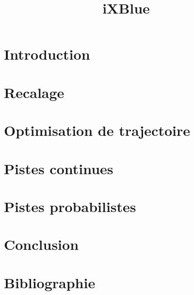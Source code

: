 \documentclass[11pt,oneside]{article}
\title{iXBlue}
\author{}
\date{}
\begin{document}
\maketitle
\setcounter{tocdepth}{1}
\tableofcontents

\section{Introduction}
\section{Recalage}
\section{Optimisation de trajectoire}
\section{Pistes continues}
\section{Pistes probabilistes}
\section{Conclusion}
\section{Bibliographie}
\end{document}
